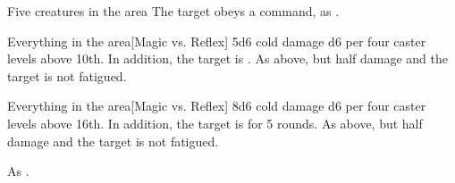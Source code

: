 \begin{spellheader}
    \spellrng{\rngmed}
\end{spellheader}
\begin{spelleffects}
    \begin{spelltarget}{Five creatures in the area}
        \spellsuccess The target obeys a command, as .
    \end{spelltarget}
\end{spelleffects}
\begin{spellfooter}
    
\end{spellfooter}

\begin{spellheader}
    \spelldur{\durshort}
\end{spellheader}
\begin{spelleffects}
    \begin{spelltarget}{Everything in the area}[Magic vs. Reflex]
        \spellsuccess 5d6 cold damage \add d6 per four caster levels above 10th. In addition, the target is \fatigued.
        \spellfailure As above, but half damage and the target is not fatigued.
    \end{spelltarget}
\end{spelleffects}
\begin{spellfooter}
    \spellnotes \destructivespellnotes
\end{spellfooter}

\begin{spellheader}
\end{spellheader}
\begin{spelleffects}
    \begin{spelltarget}{Everything in the area}[Magic vs. Reflex]
        \spellsuccess 8d6 cold damage \add d6 per four caster levels above 16th. In addition, the target is \fatigued for 5 rounds.
        \spellfailure As above, but half damage and the target is not fatigued.
    \end{spelltarget}
\end{spelleffects}
\begin{spellfooter}
    \spellnotes As .
\end{spellfooter}

